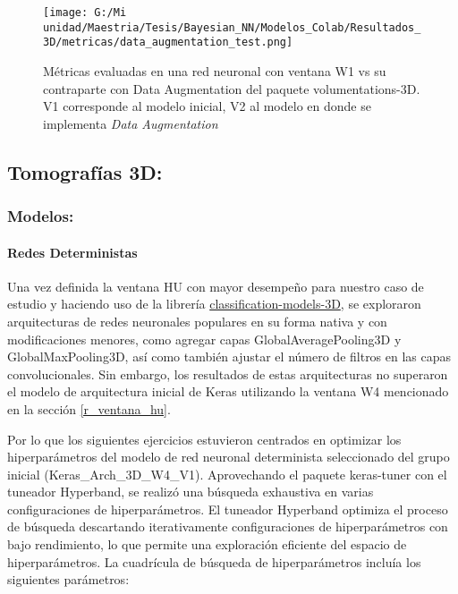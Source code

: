 \documentclass[10pt, oneside, a4paper]{article}
\begin{document}
	\begin{figure}[H]
	\centering
	\texttt{[image: G:/Mi unidad/Maestria/Tesis/Bayesian\_NN/Modelos\_Colab/Resultados\_3D/metricas/data\_augmentation\_test.png]}
	\caption{Métricas evaluadas en una red neuronal con ventana W1 vs su contraparte con Data Augmentation del paquete volumentations-3D. V1 corresponde al modelo inicial, V2 al modelo en donde se implementa \textsl{Data Augmentation}}
	\label{fig:data_augmentation_test}
	\end{figure}	

	\subsection{Tomografías 3D:} \label{resultados_3d}
	
	\subsubsection{Modelos:} \label{r_modelos_3d}
	
	\paragraph{Redes Deterministas}	
	
	Una vez definida la ventana HU con mayor desempeño para nuestro caso de estudio y haciendo uso de la librería \href{https://github.com/ZFTurbo/classification_models_3D}{classification-models-3D}, se exploraron arquitecturas de redes neuronales populares en su forma nativa y con modificaciones menores, como agregar capas GlobalAveragePooling3D y GlobalMaxPooling3D, así como también ajustar el número de filtros en las capas convolucionales. Sin embargo, los resultados de estas arquitecturas no superaron el modelo de arquitectura inicial de Keras utilizando la ventana W4 mencionado en la sección \ref{r_ventana_hu}.
	
	Por lo que los siguientes ejercicios estuvieron centrados en optimizar los hiperparámetros del modelo de red neuronal determinista seleccionado del grupo inicial (Keras\_Arch\_3D\_W4\_V1). Aprovechando el paquete keras-tuner \cite{omalley2019kerastuner} con el tuneador Hyperband, se realizó una búsqueda exhaustiva en varias configuraciones de hiperparámetros. El tuneador Hyperband optimiza el proceso de búsqueda descartando iterativamente configuraciones de hiperparámetros con bajo rendimiento, lo que permite una exploración eficiente del espacio de hiperparámetros. La cuadrícula de búsqueda de hiperparámetros incluía los siguientes parámetros:
	
\end{document}
